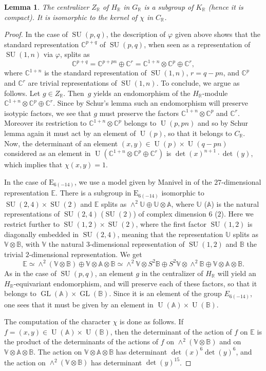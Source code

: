 \documentclass[10pt]{amsart}
\newcommand{\citestar}[3]{\cite[#3]{#1}}
\theoremstyle{plain}
\newtheorem{lemm}[theo]{Lemma}
\theoremstyle{definition}
\DeclareMathOperator{\GL}{GL}
\DeclareMathOperator{\SU}{SU}
\DeclareMathOperator{\rU}{U}
\newcommand{\bA}{\mathbb{A}}
\newcommand{\bB}{\mathbb{B}}
\newcommand{\bC}{\mathbb{C}}
\newcommand{\bE}{\mathbb{E}}
\newcommand{\bU}{\mathbb{U}}
\newcommand{\bV}{\mathbb{V}}
\newcommand{\bR}{\mathbb{R}}
\begin{document}
\begin{lemm}
\label{lemm:Z}
The centralizer $Z_\bR$ of $H_\bR$ in $G_\bR$ is a subgroup of $K_\bR$ (hence it is compact). It is
isomorphic to the kernel of $\chi$ in $C_\bR$.
\end{lemm}
\begin{proof}
In the case of $\SU(p,q)$, the description of $\varphi$ given above shows that the standard
representation $\bC^{p+q}$ of $\SU(p,q)$, when seen as a representation of $\SU(1,n)$ via
$\varphi$, splits as
$$
\bC^{p+q}=\bC^{p+pn}\oplus\bC^r=\bC^{1+n}\otimes\bC^p\oplus\bC^r,
$$
where $\bC^{1+n}$ is the standard representation of $\SU(1,n)$, $r=q-pn$, and
$\bC^p$ and $\bC^r$ are trivial representations of $\SU(1,n)$.
To conclude, we argue as follows. Let \hbox{$g \in Z_\bR$}. Then~$g$ yields an endomorphism
of the $H_\bR$-module $\bC^{1+n}\otimes\bC^p\oplus\bC^r$. Since by Schur's lemma
such an endomorphism will
preserve isotypic factors, we see that
$g$ must preserve the factors $\bC^{1+n}\otimes\bC^p$ and $\bC^r$. Moreover its
restriction to $\bC^{1+n}\otimes\bC^p$ belongs to
$\rU(p,pn)$ and so by Schur lemma again
it must act by an element of $\rU(p)$, so that it belongs to $C_\bR$. Now, the determinant of an element
$(x,y) \in \rU(p) \times \rU(q-pn)$ considered as an element in $\rU(\bC^{1+n}\otimes\bC^p\oplus\bC^r)$ is
$\det(x)^{n+1} \cdot \det(y)$, which implies that $\chi(x,y)=1$.

In the case of $\mathrm{E}_{6(-14)}$, we use a model given
by Manivel in \citestar{manivel}*{Ex.\,3 p.\,464} of the $27$-dimensional representation $\bE$.
There is a subgroup in $\mathrm{E}_{6(-14)}$ isomorphic to $\SU(2,4) \times \SU(2)$ and $\bE$ splits as
$\wedge^2 \bU \oplus \bU \otimes \bA$, where
$\bU$ (\resp $\bA$) is the natural representations of $\SU(2,4)$ (\resp $\SU(2)$) of complex dimension $6$ (\resp $2$).
Here we restrict further to $\SU(1,2) \times \SU(2)$, where the first factor $\SU(1,2)$ is
diagonally embedded in $\SU(2,4)$, meaning that the representation
$\bU$ splits as $\bV \otimes \bB$, with $\bV$ the natural $3$-dimensional representation of
$\SU(1,2)$ and $\bB$
the trivial $2$-dimensional representation. We get
$$
\bE \simeq \wedge^2(\bV \otimes \bB) \oplus \bV \otimes \bA \otimes \bB
\simeq \wedge^2 \bV \otimes S^2 \bB \oplus S^2 \bV \otimes \wedge^2 \bB \oplus \bV \otimes \bA \otimes \bB.
$$
As in the case of $\SU(p,q)$, an element $g$ in the centralizer of $H_\bR$ will yield an
$H_\bR$\nobreakdash-equivariant endomorphism, and will preserve each of these factors, so that it belongs to
$\GL(\bA) \times \GL(\bB)$.
Since it is an element of the group $E_{6(-14)}$, one sees that it must be given by an
element in $\rU(\bA) \times \rU(\bB)$.

The computation of the character $\chi$ is done as follows. If $f=(x,y) \in \rU(\bA) \times \rU(\bB)$,
then the determinant of the action of $f$ on
$\bE$ is the product of the determinants of the actions of $f$ on $\wedge^2(\bV \otimes \bB)$ and on
$\bV \otimes \bA \otimes \bB$.
The action on $\bV \otimes \bA \otimes \bB$ has determinant $\det(x)^6\det(y)^6$, and the action on
$\wedge^2(\bV \otimes \bB)$
has determinant $\det(y)^{15}$.
\end{proof}
\end{document}
